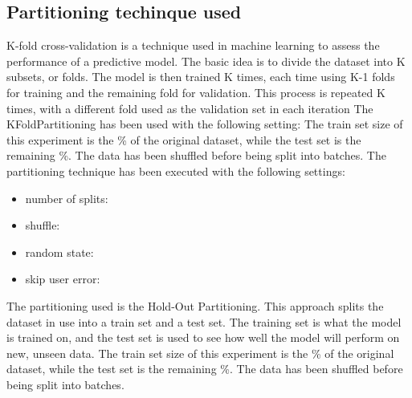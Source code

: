 \documentclass[11pt]{article}
\begin{document}
\subsection{Partitioning techinque used}\label{subsec:partitioning}
K-fold cross-validation is a technique used in machine learning to assess
the performance of a predictive model. The basic idea is to divide the dataset
into K subsets, or folds. The model is then trained K times, each time using K-1
folds for training and the remaining fold for validation. This process is
repeated K times, with a different fold used as the validation set in each iteration
\hfill\break
\hfill\break
The KFoldPartitioning has been used with the following setting:
\hfill\break
\hfill\break
The train set size of this experiment is the \%
of the original dataset, while the test set is the remaining \%.
\hfill\break
\hfill\break
{}
The data has been shuffled before being split into batches.
The partitioning technique has been executed with the following settings:
\begin{itemize}
    \item number of splits: 
    \item shuffle: 
    \item random state: 
    \item skip user error: 
\end{itemize}
\hfill\break
\hfill\break


The partitioning used is the Hold-Out Partitioning.
This approach splits the dataset in use into a train set and a test set.
The training set is what the model is trained on, and the test set is used to see how
well the model will perform on new, unseen data.
\hfill\break
\hfill\break
The train set size of this experiment is the \%
of the original dataset, while the test set is the remaining \%.
\hfill\break
\hfill\break
{}
The data has been shuffled before being split into batches.
\hfill\break
\hfill\break
\end{document}
